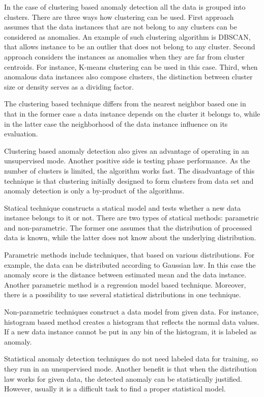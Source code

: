 In the case of clustering based anomaly detection all the data is grouped into clusters.
There are three ways how clustering can be used.
First approach assumes that the data instances that are not belong to any clusters can be considered as anomalies.
An example of such clustering algorithm is DBSCAN, that allows instance to be an outlier that does not belong to any cluster.
Second approach considers the instances as anomalies when they are far from cluster centroids.
For instance, K-means clustering can be used in this case.
Third, when anomalous data instances also compose clusters, the distinction between cluster size or density serves as a dividing factor.

The clustering based technique differs from the nearest neighbor based one in that in the former case a data instance depends on the cluster it belongs to, while in the latter case the neighborhood of the data instance influence on its evaluation.

Clustering based anomaly detection also gives an advantage of operating in an unsupervised mode.
Another positive side is testing phase performance.
As the number of clusters is limited, the algorithm works fast.
The disadvantage of this technique is that clustering initially designed to form clusters from data set and anomaly detection is only a by-product of the algorithms.

Statical technique constructs a statical model and tests whether a new data instance belongs to it or not.
There are two types of statical methods: parametric and non-parametric.
The former one assumes that the distribution of processed data is known, while the latter does not know about the underlying distribution.

Parametric methods include techniques, that based on various distributions.
For example, the data can be distributed according to Gaussian law.
In this case the anomaly score is the distance between estimated mean and the data instance.
Another parametric method is a regression model based technique.
Moreover, there is a possibility to use several statistical distributions in one technique.

Non-parametric techniques construct a data model from given data.
For instance, histogram based method creates a histogram that reflects the normal data values.
If a new data instance cannot be put in any bin of the histogram, it is labeled as anomaly.

Statistical anomaly detection techniques do not need labeled data for training, so they run in an unsupervised mode.
Another benefit is that when the distribution law works for given data, the detected anomaly can be statistically justified.
However, usually it is a difficult task to find a proper statistical model.


